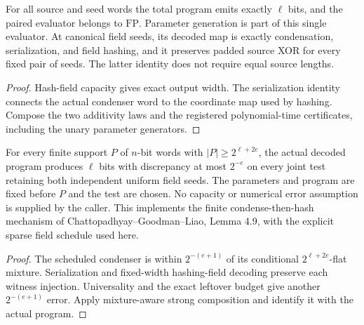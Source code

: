 \begin{theorem}
  \label{thm:lowerbounds-algebraic-one-shot-program}
  \leanok
  For all source and seed words the total program emits exactly $\ell$
  bits, and the paired evaluator belongs to $\mathrm{FP}$. Parameter
  generation is part of this single evaluator. At canonical field seeds,
  its decoded map is exactly condensation, serialization, and field hashing,
  and it preserves padded source XOR for every fixed pair of seeds.
  The latter identity does not require equal source lengths.
\end{theorem}
\begin{proof}
  \leanok
  Hash-field capacity gives exact output width. The serialization identity
  connects the actual condenser word to the coordinate map used by hashing.
  Compose the two additivity laws and the registered polynomial-time
  certificates, including the unary parameter generators.
\end{proof}

\begin{theorem}
  \label{thm:lowerbounds-algebraic-one-shot-extraction}
  \leanok
  For every finite support $P$ of $n$-bit words with
  $|P|\ge2^{\ell+2e}$, the actual decoded program produces $\ell$ bits
  with discrepancy at most $2^{-e}$ on every joint test retaining both
  independent uniform field seeds. The parameters and program are fixed
  before $P$ and the test are chosen. No capacity or numerical error
  assumption is supplied by the caller. This implements the finite
  condense-then-hash mechanism of Chattopadhyay--Goodman--Liao, Lemma 4.9,
  with the explicit sparse field schedule used here.
\end{theorem}
\begin{proof}
  \leanok
  The scheduled condenser is within $2^{-(e+1)}$ of its conditional
  $2^{\ell+2e}$-flat mixture. Serialization and fixed-width hashing-field
  decoding preserve each witness injection. Universality and the exact
  leftover budget give another $2^{-(e+1)}$ error. Apply mixture-aware
  strong composition and identify it with the actual program.
\end{proof}

